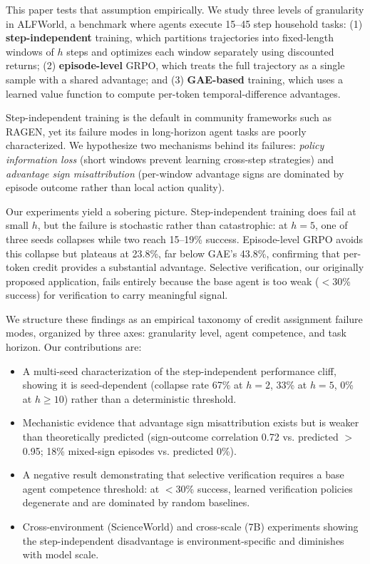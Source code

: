 \documentclass[11pt]{article}
\begin{document}
This paper tests that assumption empirically.
We study three levels of granularity in ALFWorld, a benchmark where agents execute 15--45 step household tasks: (1) \textbf{step-independent} training, which partitions trajectories into fixed-length windows of $h$ steps and optimizes each window separately using discounted returns; (2) \textbf{episode-level} GRPO, which treats the full trajectory as a single sample with a shared advantage; and (3) \textbf{GAE-based} training, which uses a learned value function to compute per-token temporal-difference advantages.

Step-independent training is the default in community frameworks such as RAGEN, yet its failure modes in long-horizon agent tasks are poorly characterized.
We hypothesize two mechanisms behind its failures: \emph{policy information loss} (short windows prevent learning cross-step strategies) and \emph{advantage sign misattribution} (per-window advantage signs are dominated by episode outcome rather than local action quality).

Our experiments yield a sobering picture.
Step-independent training does fail at small $h$, but the failure is stochastic rather than catastrophic: at $h{=}5$, one of three seeds collapses while two reach 15--19\% success.
Episode-level GRPO avoids this collapse but plateaus at 23.8\%, far below GAE's 43.8\%, confirming that per-token credit provides a substantial advantage.
Selective verification, our originally proposed application, fails entirely because the base agent is too weak ($<$30\% success) for verification to carry meaningful signal.

We structure these findings as an empirical taxonomy of credit assignment failure modes, organized by three axes: granularity level, agent competence, and task horizon.
Our contributions are:
\begin{itemize}
\item A multi-seed characterization of the step-independent performance cliff, showing it is seed-dependent (collapse rate 67\% at $h{=}2$, 33\% at $h{=}5$, 0\% at $h{\geq}10$) rather than a deterministic threshold.
\item Mechanistic evidence that advantage sign misattribution exists but is weaker than theoretically predicted (sign-outcome correlation 0.72 vs. predicted $>$0.95; 18\% mixed-sign episodes vs. predicted 0\%).
\item A negative result demonstrating that selective verification requires a base agent competence threshold: at $<$30\% success, learned verification policies degenerate and are dominated by random baselines.
\item Cross-environment (ScienceWorld) and cross-scale (7B) experiments showing the step-independent disadvantage is environment-specific and diminishes with model scale.
\end{itemize}
\end{document}
